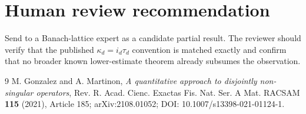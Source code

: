 \documentclass[11pt]{article}
\begin{document}
\section*{Human review recommendation}

Send to a Banach-lattice expert as a candidate partial result.  The reviewer
should verify that the published $\kappa_d=i_d\tau_d$ convention is matched
exactly and confirm that no broader known lower-estimate theorem already
subsumes the observation.

\begin{thebibliography}{9}
M. Gonzalez and A. Martinon,
\emph{A quantitative approach to disjointly non-singular operators},
Rev. R. Acad. Cienc. Exactas Fis. Nat. Ser. A Mat. RACSAM
\textbf{115} (2021), Article 185;
arXiv:2108.01052; DOI: 10.1007/s13398-021-01124-1.
\end{thebibliography}
\end{document}

